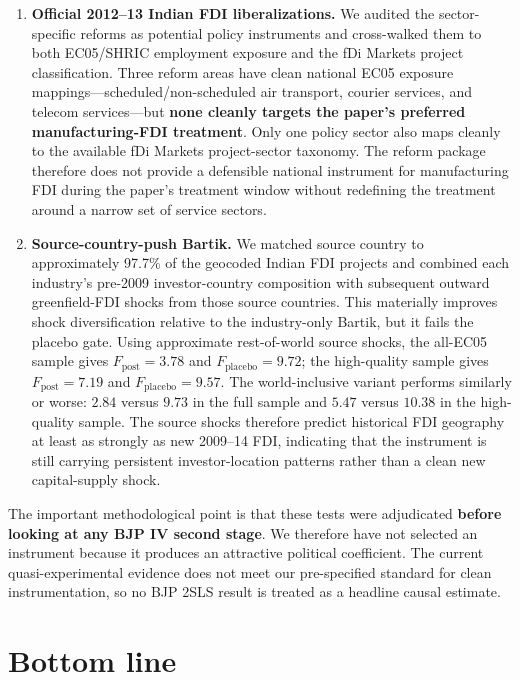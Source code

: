 \documentclass[11pt]{article}
\begin{document}
\begin{enumerate}[label=\arabic*.,leftmargin=2.1em]
\item \textbf{Official 2012--13 Indian FDI liberalizations.} We audited the sector-specific reforms as potential policy instruments and cross-walked them to both EC05/SHRIC employment exposure and the fDi Markets project classification. Three reform areas have clean national EC05 exposure mappings---scheduled/non-scheduled air transport, courier services, and telecom services---but \textbf{none cleanly targets the paper's preferred manufacturing-FDI treatment}. Only one policy sector also maps cleanly to the available fDi Markets project-sector taxonomy. The reform package therefore does not provide a defensible national instrument for manufacturing FDI during the paper's treatment window without redefining the treatment around a narrow set of service sectors.

\item \textbf{Source-country-push Bartik.} We matched source country to approximately 97.7\% of the geocoded Indian FDI projects and combined each industry's pre-2009 investor-country composition with subsequent outward greenfield-FDI shocks from those source countries. This materially improves shock diversification relative to the industry-only Bartik, but it fails the placebo gate. Using approximate rest-of-world source shocks, the all-EC05 sample gives $F_{\text{post}}=3.78$ and $F_{\text{placebo}}=9.72$; the high-quality sample gives $F_{\text{post}}=7.19$ and $F_{\text{placebo}}=9.57$. The world-inclusive variant performs similarly or worse: $2.84$ versus $9.73$ in the full sample and $5.47$ versus $10.38$ in the high-quality sample. The source shocks therefore predict historical FDI geography at least as strongly as new 2009--14 FDI, indicating that the instrument is still carrying persistent investor-location patterns rather than a clean new capital-supply shock.
\end{enumerate}

The important methodological point is that these tests were adjudicated \textbf{before looking at any BJP IV second stage}. We therefore have not selected an instrument because it produces an attractive political coefficient. The current quasi-experimental evidence does not meet our pre-specified standard for clean instrumentation, so no BJP 2SLS result is treated as a headline causal estimate.

\section*{Bottom line}
\end{document}
